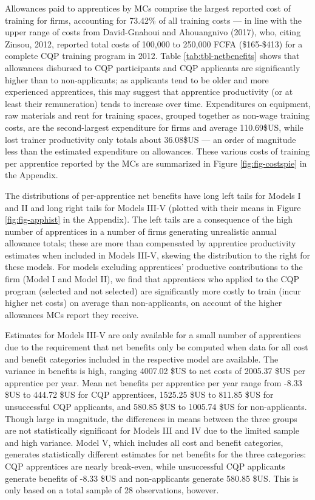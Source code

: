 \documentclass[
  11pt,
a4paper
]{article}
\begin{document}
Allowances paid to apprentices by MCs comprise the largest reported cost of training for firms, accounting for 73.42\% of all training costs --- in line with the upper range of costs from David-Gnahoui and Ahouangnivo (2017), who, citing Zinsou, 2012, reported total costs of 100,000 to 250,000 FCFA (\$165-\$413) for a complete CQP training program in 2012. Table \ref{tab:tbl-netbenefits} shows that allowances disbursed to CQP participants and CQP applicants are significantly higher than to non-applicants; as applicants tend to be older and more experienced apprentices, this may suggest that apprentice productivity (or at least their remuneration) tends to increase over time. Expenditures on equipment, raw materials and rent for training spaces, grouped together as non-wage training costs, are the second-largest expenditure for firms and average 110.69\$US, while lost trainer productivity only totals about 36.08\$US --- an order of magnitude less than the estimated expenditure on allowances. These various costs of training per apprentice reported by the MCs are summarized in Figure \ref{fig:fig-costspie} in the Appendix.

The distributions of per-apprentice net benefits have long left tails for Models I and II and long right tails for Models III-V (plotted with their means in Figure \ref{fig:fig-apphist} in the Appendix). The left tails are a consequence of the high number of apprentices in a number of firms generating unrealistic annual allowance totals; these are more than compensated by apprentice productivity estimates when included in Models III-V, skewing the distribution to the right for these models. For models excluding apprentices' productive contributions to the firm (Model I and Model II), we find that apprentices who applied to the CQP program (selected and not selected) are significantly more costly to train (incur higher net costs) on average than non-applicants, on account of the higher allowances MCs report they receive.

Estimates for Models III-V are only available for a small number of apprentices due to the requirement that net benefits only be computed when data for all cost and benefit categories included in the respective model are available. The variance in benefits is high, ranging 4007.02 \$US to net costs of 2005.37 \$US per apprentice per year. Mean net benefits per apprentice per year range from -8.33 \$US to 444.72 \$US for CQP apprentices, 1525.25 \$US to 811.85 \$US for unsuccessful CQP applicants, and 580.85 \$US to 1005.74 \$US for non-applicants. Though large in magnitude, the differences in means between the three groups are not statistically significant for Models III and IV due to the limited sample and high variance. Model V, which includes all cost and benefit categories, generates statistically different estimates for net benefits for the three categories: CQP apprentices are nearly break-even, while unsuccessful CQP applicants generate benefits of -8.33 \$US and non-applicants generate 580.85 \$US. This is only based on a total sample of 28 observations, however.
\end{document}
